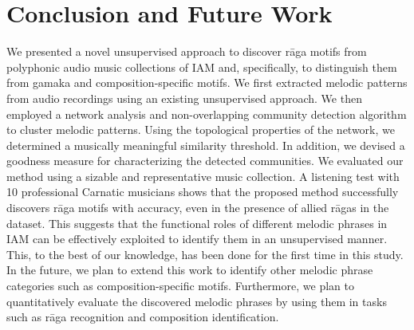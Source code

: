 \section{Conclusion and Future Work}
\label{sec:conclusion}

We presented a novel unsupervised approach to discover r\={a}ga motifs from polyphonic audio music collections of IAM and, specifically, to distinguish them from gamaka and composition-specific motifs. We first extracted melodic patterns from audio recordings using an existing unsupervised approach. We then employed a network analysis and non-overlapping community detection algorithm to cluster melodic patterns. Using the topological properties of the network, we determined a musically meaningful similarity threshold. In addition, we devised a goodness measure for characterizing the detected communities. We evaluated our method using a sizable and representative music collection. A listening test with 10 professional Carnatic musicians shows that the proposed method successfully discovers r\={a}ga motifs with accuracy, even in the presence of allied r\={a}gas in the dataset. This suggests that the functional roles of different melodic phrases in IAM can be effectively exploited to identify them in an unsupervised manner. This, to the best of our knowledge, has been done for the first time in this study. In the future, we plan to extend this work to identify other melodic phrase categories such as composition-specific motifs. Furthermore, we plan to quantitatively evaluate the discovered melodic phrases by using them in tasks such as r\={a}ga recognition and composition identification.


